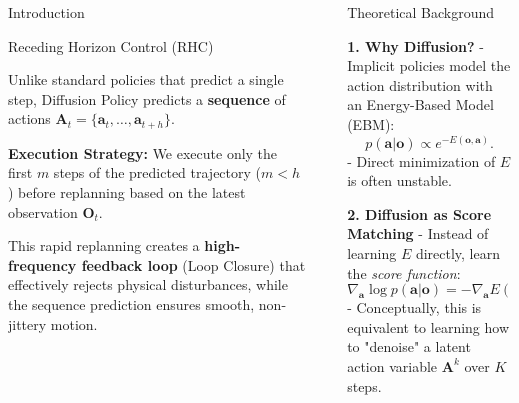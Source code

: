 \documentclass[final]{beamer}
\newlength{\sepwidth}
\newlength{\colwidth}
\newcommand{\separatorcolumn}{\begin{column}{\sepwidth}\end{column}}
\begin{document}
\begin{frame}[t]
\begin{columns}[t]
\begin{column}{\colwidth}
\begin{block}{Introduction}
\end{block}


\begin{block}{Receding Horizon Control (RHC)}

    Unlike standard policies that predict a single step, Diffusion Policy predicts a \textbf{sequence} of actions $\mathbf{A}_t = \{\mathbf{a}_t, \dots, \mathbf{a}_{t+h}\}$.
    
    \vspace{0.3em}
    
    \textbf{Execution Strategy:}
    We execute only the first $m$ steps of the predicted trajectory ($m < h$) before replanning based on the latest observation $\mathbf{O}_t$.
    
    \vspace{0.3em}
    
    This rapid replanning creates a \textbf{high-frequency feedback loop} (Loop Closure) that effectively rejects physical disturbances, while the sequence prediction ensures smooth, non-jittery motion.

\end{block}

\end{column}

\separatorcolumn

\begin{column}{\colwidth}
\vspace{-1cm}
\begin{block}{Theoretical Background}

\textbf{1. Why Diffusion?}  
- Implicit policies model the action distribution with an Energy-Based Model (EBM):  
\[
p(\mathbf{a}|\mathbf{o}) \propto e^{-E(\mathbf{o}, \mathbf{a})}.
\]  
- Direct minimization of $E$ is often unstable.

\vspace{0.5em}

\textbf{2. Diffusion as Score Matching}  
- Instead of learning $E$ directly, learn the \emph{score function}:
\[
\nabla_{\mathbf{a}} \log p(\mathbf{a}|\mathbf{o}) = -\nabla_{\mathbf{a}} E(\mathbf{o}, \mathbf{a})
\]  
- Conceptually, this is equivalent to learning how to "denoise" a latent action variable $\mathbf{A}^k$ over $K$ steps.

\vspace{0.5em}


\end{block}
\end{column}
\end{columns}
\end{frame}
\end{document}
